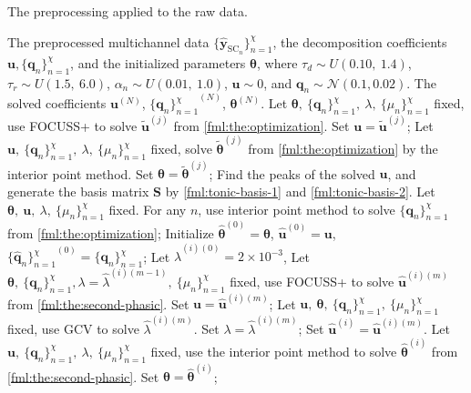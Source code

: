 \documentclass[10pt,conference]{ieeeconf}
\begin{document}
\begin{algorithm}[!tb]
  \caption{The preprocessing applied to the raw data.}
  \label{alg:deconvolution}
  \begin{algorithmic}[1]
    \REQUIRE The preprocessed multichannel data $\{\hat{\mathbf{y}}_{\mathrm{SC}_n}\}_{n=1}^\chi$, the decomposition coefficients $\mathbf{u}, \{\mathbf{q}_{n}\}_{n=1}^\chi$, and the initialized parameters $\boldsymbol{\theta}$, where $\tau_d \sim U(0.10,~1.4)$, $\tau_r \sim U(1.5,~6.0)$, $\alpha_n \sim U(0.01,~1.0)$, $\mathbf{u} \sim 0$, and $\mathbf{q}_n \sim \mathcal{N}(0.1, 0.02)$.
    \ENSURE The solved coefficients $\mathbf{u}^{(N)}$, ${\{\mathbf{q}_{n}\}_{n=1}^\chi}^{(N)}$, $\boldsymbol{\theta}^{(N)}$.
    \STATE Let $\boldsymbol{\theta},~\{\mathbf{q}_{n}\}_{n=1}^{\chi},~\lambda,~\{\mu_n\}_{n=1}^{\chi}$ fixed, use FOCUSS+ to solve $\tilde{\mathbf{u}}^{(j)}$ from \eqref{fml:the:optimization}. Set $\mathbf{u} = \tilde{\mathbf{u}}^{(j)}$;
    \STATE Let $\mathbf{u},~\{\mathbf{q}_{n}\}_{n=1}^{\chi},~\lambda,~\{\mu_n\}_{n=1}^{\chi}$ fixed, solve $\tilde{\boldsymbol{\theta}}^{(j)}$ from \eqref{fml:the:optimization} by the interior point method. Set $\boldsymbol{\theta} = \tilde{\boldsymbol{\theta}}^{(j)}$;
    \STATE Find the peaks of the solved $\mathbf{u}$, and generate the basis matrix $\mathbf{S}$ by \eqref{fml:tonic-basis-1} and \eqref{fml:tonic-basis-2}.
    \STATE Let $\boldsymbol{\theta},~\mathbf{u},~\lambda,~\{\mu_n\}_{n=1}^{\chi}$ fixed. For any $n$, use interior point method to solve $\{\mathbf{q}_{n}\}_{n=1}^{\chi}$ from \eqref{fml:the:optimization};
    \ENDFOR
    \STATE Initialize $\hat{\boldsymbol{\theta}}^{(0)}=\boldsymbol{\theta}$, $\hat{\mathbf{u}}^{(0)}=\mathbf{u}$, ${\{\hat{\mathbf{q}}_{n}\}_{n=1}^{\chi}}^{(0)}=\{\mathbf{q}_{n}\}_{n=1}^{\chi}$;
    \STATE Let $\hat{\lambda}^{(i)(0)} = 2 \times 10^{-3}$,
    \STATE Let $\boldsymbol{\theta},~\{\mathbf{q}_{n}\}_{n=1}^{\chi},\lambda = \hat{\lambda}^{(i)(m-1)},~\{\mu_n\}_{n=1}^{\chi}$ fixed, use FOCUSS+ to solve $\hat{\mathbf{u}}^{(i)(m)}$ from \eqref{fml:the:second-phasic}. Set $\mathbf{u} = \hat{\mathbf{u}}^{(i)(m)}$;
    \STATE Let $\mathbf{u},~\boldsymbol{\theta},~\{\mathbf{q}_{n}\}_{n=1}^{\chi},~\{\mu_n\}_{n=1}^{\chi}$ fixed, use GCV to solve $\hat{\lambda}^{(i)(m)}$. Set $\lambda = \hat{\lambda}^{(i)(m)}$;
    \ENDFOR
    \STATE Set $\hat{\mathbf{u}}^{(i)} = \hat{\mathbf{u}}^{(i)(m)}$.
    \STATE Let $\mathbf{u},~\{\mathbf{q}_{n}\}_{n=1}^{\chi},~\lambda,~\{\mu_n\}_{n=1}^{\chi}$ fixed, use the interior point method to solve $\hat{\boldsymbol{\theta}}^{(i)}$ from \eqref{fml:the:second-phasic}. Set $\boldsymbol{\theta} = \hat{\boldsymbol{\theta}}^{(i)}$;

\end{algorithmic}
\end{algorithm}
\end{document}
